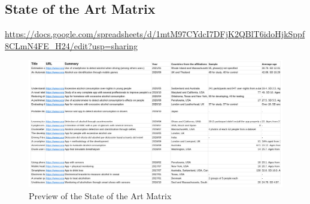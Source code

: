 \begin{appendices}

\section{\textbf{State of the Art Matrix}}
\label{appendix:matrix}
\url{https://docs.google.com/spreadsheets/d/1mtM97CYdcI7DFjK2QBlT6idoHjkSppf8CLmN4FE_H24/edit?usp=sharing}

\begin{figure}[H]
  \centering
      \includegraphics[width=1\textwidth]{./img/matriz.png}
      \caption{Preview of the State of the Art Matrix}
      \label{matrix}
\end{figure}

\end{appendices}
